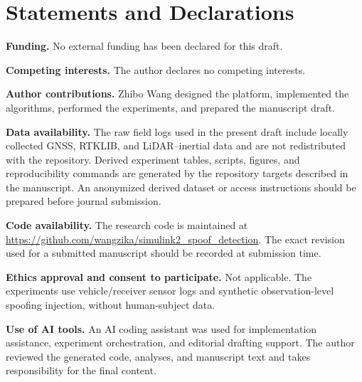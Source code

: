 \documentclass[journal]{IEEEtran}
\begin{document}
\section*{Statements and Declarations}
\textbf{Funding.}
No external funding has been declared for this draft.

\textbf{Competing interests.}
The author declares no competing interests.

\textbf{Author contributions.}
Zhibo Wang designed the platform, implemented the algorithms, performed the experiments, and prepared the manuscript draft.

\textbf{Data availability.}
The raw field logs used in the present draft include locally collected GNSS, RTKLIB, and LiDAR--inertial data and are not redistributed with the repository.
Derived experiment tables, scripts, figures, and reproducibility commands are generated by the repository targets described in the manuscript.
An anonymized derived dataset or access instructions should be prepared before journal submission.

\textbf{Code availability.}
The research code is maintained at \url{https://github.com/wangzika/simulink2_spoof_detection}.
The exact revision used for a submitted manuscript should be recorded at submission time.

\textbf{Ethics approval and consent to participate.}
Not applicable.
The experiments use vehicle/receiver sensor logs and synthetic observation-level spoofing injection, without human-subject data.

\textbf{Use of AI tools.}
An AI coding assistant was used for implementation assistance, experiment orchestration, and editorial drafting support.
The author reviewed the generated code, analyses, and manuscript text and takes responsibility for the final content.



\end{document}
